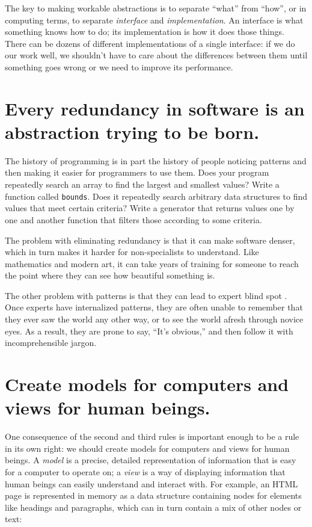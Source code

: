 \documentclass[10pt,letterpaper]{article}
\newcommand{\rulemajor}[1]{\section{#1}}
\begin{document}
The key to making workable abstractions is to separate ``what'' from ``how'', or
in computing terms, to separate \emph{interface} and \emph{implementation}.  An
interface is what something knows how to do; its implementation is how it does
those things.  There can be dozens of different implementations of a single
interface: if we do our work well, we shouldn't have to care about the
differences between them until something goes wrong or we need to improve its
performance.

\rulemajor{Every redundancy in software is an abstraction trying to be born.}

The history of programming is in part the history of people noticing patterns
and then making it easier for programmers to use them.  Does your program
repeatedly search an array to find the largest and smallest values?  Write a
function called \texttt{bounds}.  Does it repeatedly search arbitrary data
structures to find values that meet certain criteria?  Write a generator that
returns values one by one and another function that filters those according to
some criteria.

The problem with eliminating redundancy is that it can make software denser,
which in turn makes it harder for non-specialists to understand.  Like
mathematics and modern art, it can take years of training for someone to reach
the point where they can see how beautiful something is.

The other problem with patterns is that they can lead to expert blind spot
\cite{Nath2003}.  Once experts have internalized patterns, they are often unable
to remember that they ever saw the world any other way, or to see the world
afresh through novice eyes.  As a result, they are prone to say, ``It's
obvious,'' and then follow it with incomprehensible jargon.

\rulemajor{Create models for computers and views for human beings.}

One consequence of the second and third rules is important enough to be a rule
in its own right: we should create models for computers and views for human
beings.  A \emph{model} is a precise, detailed representation of information
that is easy for a computer to operate on; a \emph{view} is a way of displaying
information that human beings can easily understand and interact with.  For
example, an HTML page is represented in memory as a data structure containing
nodes for elements like headings and paragraphs, which can in turn contain a mix
of other nodes or text:
\end{document}
